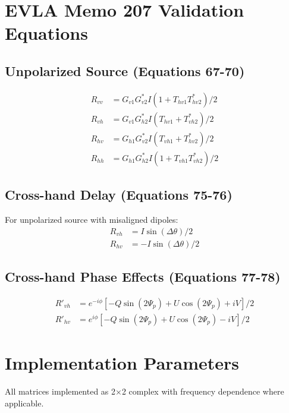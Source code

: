 \documentclass{aastex631}
\begin{document}
\section{EVLA Memo 207 Validation Equations}

\subsection{Unpolarized Source (Equations 67-70)}
\begin{align}
R_{vv} &= G_{v1}G_{v2}^* I(1 + T_{hv1}T_{hv2}^*)/2 \\
R_{vh} &= G_{v1}G_{h2}^* I(T_{hv1} + T_{vh2}^*)/2 \\
R_{hv} &= G_{h1}G_{v2}^* I(T_{vh1} + T_{hv2}^*)/2 \\
R_{hh} &= G_{h1}G_{h2}^* I(1 + T_{vh1}T_{vh2}^*)/2
\end{align}

\subsection{Cross-hand Delay (Equations 75-76)}
For unpolarized source with misaligned dipoles:
\begin{align}
R_{vh} &= I \sin(\Delta\theta)/2 \\
R_{hv} &= -I \sin(\Delta\theta)/2
\end{align}

\subsection{Cross-hand Phase Effects (Equations 77-78)}
\begin{align}
R'_{vh} &= e^{-i\phi}[-Q \sin(2\Psi_p) + U \cos(2\Psi_p) + iV]/2 \\
R'_{hv} &= e^{i\phi}[-Q \sin(2\Psi_p) + U \cos(2\Psi_p) - iV]/2
\end{align}

\section{Implementation Parameters}

All matrices implemented as 2×2 complex with frequency dependence where applicable.
\end{document}

